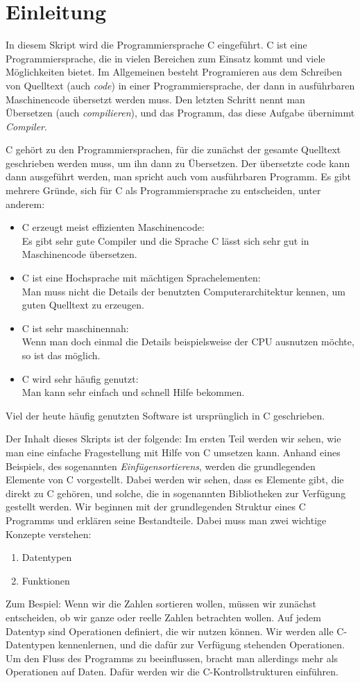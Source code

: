 \section{Einleitung}

In diesem Skript wird die Programmiersprache C eingeführt. 
C ist eine Programmiersprache, die in vielen Bereichen zum Einsatz kommt und viele Möglichkeiten bietet.
Im Allgemeinen besteht Programieren aus dem Schreiben von Quelltext (auch \emph{code}) in einer Programmiersprache, der dann in ausführbaren Maschinencode übersetzt werden muss. 
Den letzten Schritt nennt man Übersetzen (auch \emph{compilieren}), und das Programm, das diese Aufgabe übernimmt \emph{Compiler}.

C gehört zu den Programmiersprachen, für die zunächst der gesamte Quelltext geschrieben werden muss, um ihn dann zu Übersetzen. 
Der übersetzte code kann dann ausgeführt werden, man spricht auch vom ausführbaren Programm.
Es gibt mehrere Gründe, sich für C als Programmiersprache zu entscheiden, unter anderem:
\begin{itemize}
\item C erzeugt meist effizienten Maschinencode:\\
  Es gibt sehr gute Compiler und die Sprache C lässt sich sehr gut in Maschinencode übersetzen.
\item C ist eine Hochsprache mit mächtigen Sprachelementen:\\
  Man muss nicht die Details der benutzten Computerarchitektur kennen, um guten Quelltext zu erzeugen.
\item C ist sehr maschinennah:\\
  Wenn man doch einmal die Details beispielsweise der CPU ausnutzen möchte, so ist das möglich.
\item C wird sehr häufig genutzt:\\
  Man kann sehr einfach und schnell Hilfe bekommen.
\end{itemize}
Viel der heute häufig genutzten Software ist ursprünglich in C geschrieben.

Der Inhalt dieses Skripts ist der folgende: Im ersten Teil werden wir sehen, wie man eine einfache Fragestellung mit Hilfe von C umsetzen kann.
Anhand eines Beispiels, des sogenannten \emph{Einfügensortierens}, werden die grundlegenden Elemente von C vorgestellt.
Dabei werden wir sehen, dass es Elemente gibt, die direkt zu C gehören, und solche, die in sogenannten Bibliotheken zur Verfügung gestellt werden.
Wir beginnen mit der grundlegenden Struktur eines C Programms und erklären seine Bestandteile.
Dabei muss man zwei wichtige Konzepte verstehen:
\begin{enumerate}
\item Datentypen
\item Funktionen
\end{enumerate}
Zum Bespiel: Wenn wir die Zahlen sortieren wollen, müssen wir zunächst entscheiden, ob wir ganze oder reelle Zahlen betrachten wollen.
Auf jedem Datentyp sind Operationen definiert, die wir nutzen können.
Wir werden alle C-Datentypen kennenlernen, und die dafür zur Verfügung stehenden Operationen.
Um den Fluss des Programms zu beeinflussen, bracht man allerdings mehr als Operationen auf Daten. 
Dafür werden wir die C-Kontrollstrukturen einführen.

